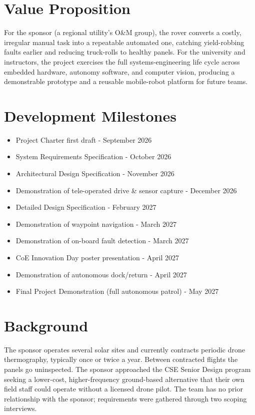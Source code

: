 \documentclass[11pt,letterpaper]{article}
\begin{document}
\section{Value Proposition}
For the sponsor (a regional utility's O\&M group), the rover converts a costly,
irregular manual task into a repeatable automated one, catching yield-robbing
faults earlier and reducing truck-rolls to healthy panels. For the university and
instructors, the project exercises the full systems-engineering life cycle across
embedded hardware, autonomy software, and computer vision, producing a
demonstrable prototype and a reusable mobile-robot platform for future teams.

\section{Development Milestones}
\begin{itemize}
  \item Project Charter first draft - September 2026
  \item System Requirements Specification - October 2026
  \item Architectural Design Specification - November 2026
  \item Demonstration of tele-operated drive \& sensor capture - December 2026
  \item Detailed Design Specification - February 2027
  \item Demonstration of waypoint navigation - March 2027
  \item Demonstration of on-board fault detection - March 2027
  \item CoE Innovation Day poster presentation - April 2027
  \item Demonstration of autonomous dock/return - April 2027
  \item Final Project Demonstration (full autonomous patrol) - May 2027
\end{itemize}
\newpage

\section{Background}
The sponsor operates several solar sites and currently contracts periodic drone
thermography, typically once or twice a year. Between contracted flights the panels
go uninspected. The sponsor approached the CSE Senior Design program seeking a
lower-cost, higher-frequency ground-based alternative that their own field staff
could operate without a licensed drone pilot. The team has no prior relationship
with the sponsor; requirements were gathered through two scoping interviews.
\end{document}
